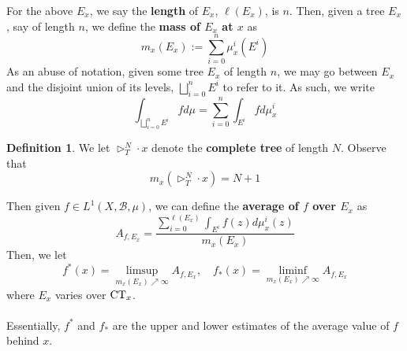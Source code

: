 \documentclass{article}
\newcommand{\CT}{\textmd{CT}}
\theoremstyle{definition}
\newtheorem{definition}[theorem]{Definition}
\begin{document}
\noindent For the above $ E_x $, we say the \textbf{length} of $ E_x $, $ \ell(E_x)$, is $ n $. Then, given a tree $ E_x $, say of length $ n $, we define the \textbf{mass of $ E_x $ at $ x $} as
\[
m_x(E_x):= \sum_{i=0}^n \mu^i_x(E^i)
\]
As an abuse of notation, given some tree $ E_x $ of length $ n $, we may go between $ E_x $ and the disjoint union of its levels, $ \bigsqcup_{i=0}^n E^i $ to refer to it. As such, we write
\[
\int_{\bigsqcup_{i=0}^n E^i} fd\mu = \sum_{i=0}^n \int_{E^i} f d\mu_x^i
\]
\begin{definition}
    We let $ \triangleright_T^N\cdot x $ denote the \textbf{complete tree} of length $ N $. Observe that
    \[
    m_x(\triangleright_T^N\cdot x) = N+1 
    \]
\end{definition}
\noindent Then given $ f\in L^1(X,\mathcal{B},\mu) $, we can define the \textbf{average of $ f $ over $ E_x $} as
\[
A_{f,E_x} = \frac{\sum_{i=0}^{\ell(E_x)} \int_{E^i}f(z)d\mu^i_x(z)}{m_x(E_x)}
\]
Then, we let
\[
f^*(x) = \limsup_{m_x(E_x)\nearrow \infty} A_{f,E_x},\quad f_*(x) = \liminf_{m_x(E_x)\nearrow \infty} A_{f,E_x}
\]
where $ E_x $ varies over $ \CT_x $.\\\\
Essentially, $ f^* $ and $ f_* $ are the upper and lower estimates of the average value of $ f $ behind $ x $.
\end{document}

